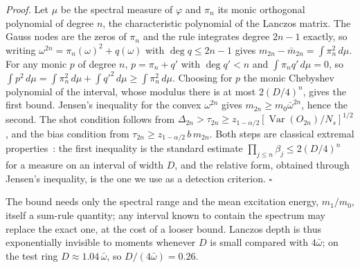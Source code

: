 \documentclass[aps,prb,reprint,onecolumn,12pt,superscriptaddress,longbibliography,floatfix]{revtex4-2}
\begin{document}
\noindent\emph{Proof.} Let $\mu$ be the spectral measure of $\varphi$ and $\pi_n$ its monic orthogonal polynomial of degree $n$, the characteristic polynomial of the Lanczos matrix. The Gauss nodes are the zeros of $\pi_n$ and the rule integrates degree $2n-1$ exactly, so writing $\omega^{2n}=\pi_n(\omega)^2+q(\omega)$ with $\deg q\le2n-1$ gives $m_{2n}-\bar m_{2n}=\int\pi_n^2\,d\mu$. For any monic $p$ of degree $n$, $p=\pi_n+q'$ with $\deg q'<n$ and $\int\pi_nq'\,d\mu=0$, so $\int p^2\,d\mu=\int\pi_n^2\,d\mu+\int q'^2\,d\mu\ge\int\pi_n^2\,d\mu$. Choosing for $p$ the monic Chebyshev polynomial of the interval, whose modulus there is at most $2(D/4)^n$, gives the first bound. Jensen's inequality for the convex $\omega^{2n}$ gives $m_{2n}\ge m_0\bar\omega^{2n}$, hence the second. The shot condition follows from $\Delta_{2n}>\tau_{2n}\ge z_{1-\alpha/2}[\operatorname{Var}(O_{2n})/N_s]^{1/2}$, and the bias condition from $\tau_{2n}\ge z_{1-\alpha/2}\,b\,m_{2n}$. Both steps are classical extremal properties~\cite{Szego1975,Gautschi2004}: the first inequality is the standard estimate $\prod_{j\le n}\beta_j\le2(D/4)^n$ for a measure on an interval of width $D$, and the relative form, obtained through Jensen's inequality, is the one we use as a detection criterion. $\square$

The bound needs only the spectral range and the mean excitation energy, $m_1/m_0$, itself a sum-rule quantity; any interval known to contain the spectrum may replace the exact one, at the cost of a looser bound. Lanczos depth is thus exponentially invisible to moments whenever $D$ is small compared with $4\bar\omega$; on the test ring $D\approx1.04\,\bar\omega$, so $D/(4\bar\omega)=0.26$.
\end{document}
